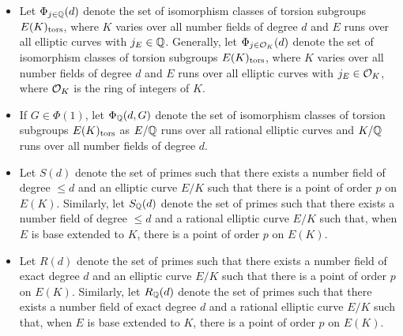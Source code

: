 \begin{itemize}
\item Let $\Phi_{j \in \mathbb{Q}}(d)$ denote the set of isomorphism classes of torsion subgroups $E(K)_{\text{tors}}$, where $K$ varies over all number fields of degree $d$ and $E$ runs over all elliptic curves with $j_E \in \mathbb{Q}$. Generally, let $\Phi_{j \in \mathcal{O}_K}(d)$ denote the set of isomorphism classes of torsion subgroups $E(K)_{\text{tors}}$, where $K$ varies over all number fields of degree $d$ and $E$ runs over all elliptic curves with $j_E \in \mathcal{O}_K$, where $\mathcal{O}_K$ is the ring of integers of $K$.

\item If $G \in \Phi(1)$, let $\Phi_{\mathbb{Q}}(d,G)$ denote the set of isomorphism classes of torsion subgroups $E(K)_{\text{tors}}$ as $E/\mathbb{Q}$ runs over all rational elliptic curves and $K/\mathbb{Q}$ runs over all number fields of degree $d$. 

\item Let $S(d)$ denote the set of primes such that there exists a number field of degree $\leq d$ and an elliptic curve $E/K$ such that there is a point of order $p$ on $E(K)$. Similarly, let $S_{\mathbb{Q}}(d)$ denote the set of primes such that there exists a number field of degree $\leq d$ and a rational elliptic curve $E/K$ such that, when $E$ is base extended to $K$, there is a point of order $p$ on $E(K)$.

\item Let $R(d)$ denote the set of primes such that there exists a number field of exact degree $d$ and an elliptic curve $E/K$ such that there is a point of order $p$ on $E(K)$. Similarly, let $R_{\mathbb{Q}}(d)$ denote the set of primes such that there exists a number field of exact degree $d$ and a rational elliptic curve $E/K$ such that, when $E$ is base extended to $K$, there is a point of order $p$ on $E(K)$.
\end{itemize}



